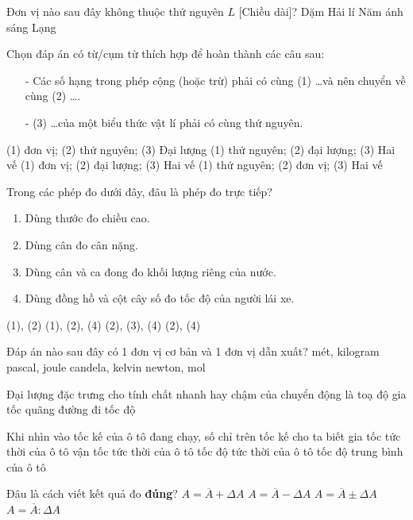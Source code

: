 \begin{ex}
	Đơn vị nào sau đây không thuộc thứ nguyên $L$ [Chiều dài]?
	\choice
	{Dặm}
	{Hải lí}
	{Năm ánh sáng}
	{\True Lạng}
	\loigiai{}
\end{ex}
\begin{ex}
	Chọn đáp án có từ/cụm từ thích hợp để hoàn thành các câu sau:
	\begin{itemize}
		\item[-] Các số hạng trong phép cộng (hoặc trừ) phải có cùng (1) \dots và nên chuyển về cùng (2) \dots.
		\item[-] (3) \dots của một biểu thức vật lí phải có cùng thứ nguyên.
	\end{itemize}
	\choice
	{(1) đơn vị; (2) thứ nguyên; (3)  Đại lượng}
	{(1) thứ nguyên; (2) đại lượng; (3) Hai vế}
	{(1) đơn vị; (2) đại lượng; (3) Hai vế}
	{\True (1) thứ nguyên; (2) đơn vị; (3) Hai vế}
	\loigiai{}
\end{ex}
\begin{ex}
	Trong các phép đo dưới đây, đâu là phép đo trực tiếp?
	\begin{enumerate}[label=(\arabic*)]
		\item Dùng thước đo chiều cao.
		\item Dùng cân đo cân nặng.
		\item Dùng cân và ca đong đo khối lượng riêng của nước.
		\item Dùng đồng hồ và cột cây số đo tốc độ của người lái xe.
	\end{enumerate}
	\choice
	{\True (1), (2)}
	{(1), (2), (4)}
	{(2), (3), (4)}
	{(2), (4)}
	\loigiai{}
\end{ex}
\begin{ex}
	Đáp án nào sau đây có 1 đơn vị cơ bản và 1 đơn vị dẫn xuất?
	\choice
	{mét, kilogram}
	{pascal, joule}
	{candela, kelvin}
	{\True newton, mol}
	\loigiai{}
\end{ex}


\begin{ex}
		Đại lượng đặc trưng cho tính chất nhanh hay chậm của chuyển động là 
	\choice
	{toạ độ}
	{gia tốc}
	{quãng đường đi}
	{\True tốc độ}
	\loigiai{}
\end{ex}
\begin{ex}
	Khi nhìn vào tốc kế của ô tô đang chạy, số chỉ trên tốc kế cho ta biết
	\choice
	{gia tốc tức thời của ô tô}
	{vận tốc tức thời của ô tô}
	{\True tốc độ tức thời của ô tô}
	{tốc độ trung bình của ô tô}
	\loigiai{}
\end{ex}
\begin{ex}
	Đâu là cách viết kết quả đo \textbf{đúng}?
	\choice
	{$A=\overline{A}+\Delta A$}
	{$A=\overline{A}-\Delta A$}
	{\True $A=\overline{A}\pm\Delta A$}
	{$A=\overline{A}:\Delta A$}
	\loigiai{}
\end{ex}

